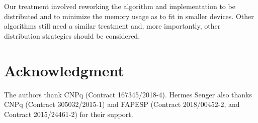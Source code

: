 Our treatment involved reworking the algorithm and implementation to be
distributed and to minimize the memory usage as to fit in smaller devices.
Other algorithms still need a similar treatment and, more importantly, other
distribution strategies should be considered.


\section*{Acknowledgment}

The authors thank CNPq (Contract 167345/2018-4).
Hermes Senger also thanks CNPq (Contract 305032/2015-1) and FAPESP (Contract
2018/00452-2, and Contract 2015/24461-2) for their support.
